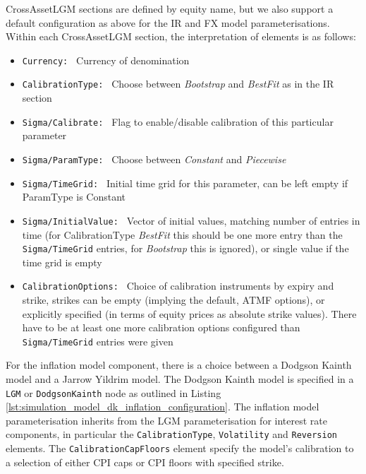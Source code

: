 \documentclass[12pt, a4paper]{article}
\begin{document}
{CrossAssetLGM sections are defined by equity name, but we also support a default configuration as above for the IR and 
FX model parameterisations.  Within each CrossAssetLGM section, the interpretation of elements is as follows:

\begin{itemize}
	\item {\tt Currency: } Currency of denomination
	\item {\tt CalibrationType: } Choose between {\em Bootstrap} and {\em BestFit} as in the IR section
	\item {\tt Sigma/Calibrate: } Flag to enable/disable calibration of this particular parameter
	\item {\tt Sigma/ParamType: } Choose between {\em Constant} and {\em Piecewise}
	\item {\tt Sigma/TimeGrid: } Initial time grid for this parameter, can be left empty if ParamType is Constant
	\item {\tt Sigma/InitialValue: } Vector of initial values, matching number of entries in time (for CalibrationType {\em BestFit} this should be one more entry than the {\tt Sigma/TimeGrid} entries, for {\em Bootstrap} this is ignored), or single value if the time grid is empty
	\item {\tt CalibrationOptions: } Choice of calibration instruments by expiry and strike, strikes can be empty 
	(implying the default, ATMF options), or explicitly specified (in terms of equity prices as absolute strike values). There have to be at least one more calibration options configured than {\tt Sigma/TimeGrid} entries were given
\end{itemize}

\medskip

For the inflation model component, there is a choice between a Dodgson Kainth model and a Jarrow Yildrim model. The Dodgson Kainth 
model is specified in a \lstinline!LGM! or \lstinline!DodgsonKainth! node as outlined in Listing \ref{lst:simulation_model_dk_inflation_configuration}.
The inflation model parameterisation inherits from the LGM parameterisation for interest rate components, in particular the \lstinline!CalibrationType!, 
\lstinline!Volatility! and \lstinline!Reversion! elements. The \lstinline!CalibrationCapFloors! element specify the model's calibration to a selection of 
either CPI caps or CPI floors with specified strike.

}
\end{document}
